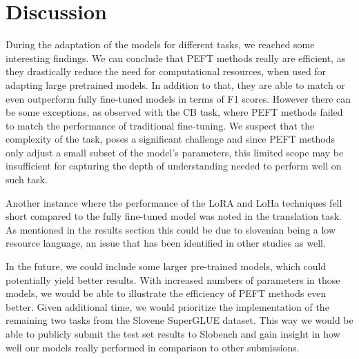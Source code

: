 \documentclass[fleqn,moreauthors,10pt]{ds_report}
\begin{document}





\section*{Discussion}

During the adaptation of the models for different tasks, we reached some interesting findings. We can conclude that PEFT methods really are efficient, as they drastically reduce the need for computational resources, when used for adapting large pretrained models.
In addition to that, they are able to match or even outperform fully fine-tuned models in terms of F1 scores. However there can be some exceptions, as observed with the CB task, where PEFT methods failed to match the performance of traditional fine-tuning. We suspect that the complexity of the task, poses a significant challenge and since PEFT methods only adjust a small subset of the model's parameters, this limited scope may be insufficient for capturing the depth of understanding needed to perform well on such task.

Another instance where the performance of the LoRA and LoHa techniques fell short compared to the fully fine-tuned model was noted in the translation task. As mentioned in the results section this could be due to slovenian being a low resource language, an issue that has been identified in other studies as well.

In the future, we could include some larger pre-trained models, which could potentially yield better results. With increased numbers of parameters in those models, we would be able to illustrate the efficiency of PEFT methods even better.
Given additional time, we would prioritize the implementation of the remaining two tasks from the Slovene SuperGLUE dataset. This way we would be able to publicly submit the test set results to Slobench and gain insight in how well our models really performed in comparison to other submissions.
\end{document}
